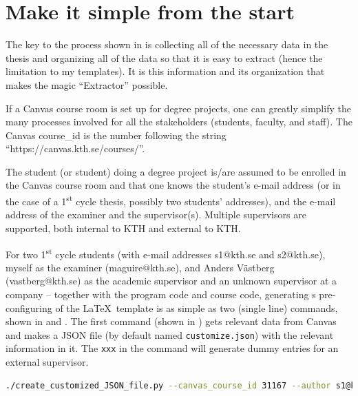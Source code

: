 \section{Make it simple from the start}
\label{sec:makeItSimpleFromTheStart}

The key to the process shown in  is collecting all of the necessary data in the thesis and organizing all of the data so that it is easy to extract (hence the limitation to my templates). It is this information and its organization that makes the magic ``Extractor'' possible.

If a Canvas course room is set up for degree projects, one can greatly simplify the many processes involved for all the stakeholders (students, faculty, and staff). The Canvas course\_id is the number following the string ``https://canvas.kth.se/courses/''.

The student (or student) doing a degree project is/are assumed to be enrolled in the Canvas course room and that one knows the student’s e-mail address (or in the case of a 1\textsuperscript{st} cycle thesis, possibly two students’ addresses), and the e-mail address of the examiner and the supervisor(s). Multiple supervisors are supported, both internal to KTH and external to KTH.

For two 1\textsuperscript{st} cycle students (with e-mail addresses s1@kth.se and s2@kth.se), myself as the examiner (maguire@kth.se), and Anders Västberg (vastberg@kth.se) as the academic supervisor and an unknown supervisor at a company – together with the program code and course code, generating s pre-configuring of the \LaTeX~template is as simple as two (single line) commands, shown in  and . The first command (shown in ) gets relevant data from Canvas and makes a JSON file (by default named \texttt{customize.json}) with the relevant information in it. The \texttt{xxx} in the command will generate dummy entries for an external supervisor.

\begin{lstlisting}[language={bash}, caption={Example of creating a customized JSON file for two students}, label=lst:createCustomizeJSON]
./create_customized_JSON_file.py --canvas_course_id 31167 --author s1@kth.se --author2 s2@kth.se --language eng --programCode TIDAB --Examiner maguire --Supervisor vastberg   --Supervisor2 xxx --courseCode II142X  --exam högskoleingenjör
\end{lstlisting}

